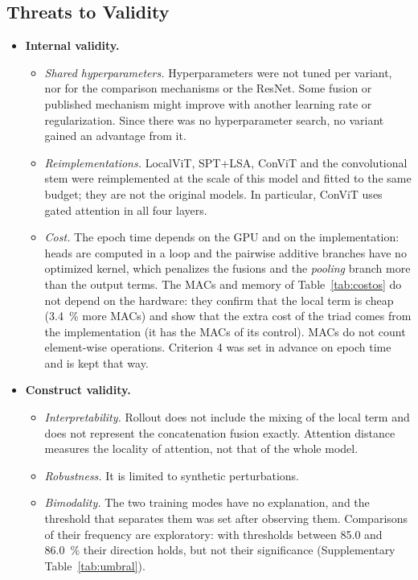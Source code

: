 \subsection{Threats to Validity}
\label{sec:limitaciones}
\begin{itemize}
  \item \textbf{Internal validity.}
  \begin{itemize}
    \item \emph{Shared hyperparameters.} Hyperparameters were not tuned per variant, nor for the comparison mechanisms or the ResNet. Some fusion or published mechanism might improve with another learning rate or regularization. Since there was no hyperparameter search, no variant gained an advantage from it.
    \item \emph{Reimplementations.} LocalViT, SPT+LSA, ConViT and the convolutional stem were reimplemented at the scale of this model and fitted to the same budget; they are not the original models. In particular, ConViT uses gated attention in all four layers.
    \item \emph{Cost.} The epoch time depends on the GPU and on the implementation: heads are computed in a loop and the pairwise additive branches have no optimized kernel, which penalizes the fusions and the \emph{pooling} branch more than the output terms. The MACs and memory of Table~\ref{tab:costos} do not depend on the hardware: they confirm that the local term is cheap (3.4~\% more MACs) and show that the extra cost of the triad comes from the implementation (it has the MACs of its control). MACs do not count element-wise operations. Criterion 4 was set in advance on epoch time and is kept that way.
  \end{itemize}
  \item \textbf{Construct validity.}
  \begin{itemize}
    \item \emph{Interpretability.} Rollout does not include the mixing of the local term and does not represent the concatenation fusion exactly. Attention distance measures the locality of attention, not that of the whole model.
    \item \emph{Robustness.} It is limited to synthetic perturbations.
    \item \emph{Bimodality.} The two training modes have no explanation, and the threshold that separates them was set after observing them. Comparisons of their frequency are exploratory: with thresholds between 85.0 and 86.0~\% their direction holds, but not their significance (Supplementary Table~\ref{tab:umbral}).

\end{itemize}
\end{itemize}
